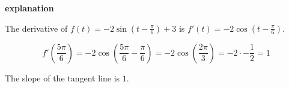 \documentclass{ximera}
\begin{document}
\begin{example}
\textbf{\textcolor{red!75!green}{explanation}} 



The derivative of $f(t) = -2 \sin\left( t - \frac{\pi}{6} \right) + 3$ is $f'(t) = -2 \cos\left( t - \frac{\pi}{6} \right)$.



\[ f'\left( \frac{5 \pi}{6} \right) = -2 \cos\left( \frac{5 \pi}{6} - \frac{\pi}{6} \right) = -2 \cos\left( \frac{2 \pi}{3} \right)  = -2 \cdot -\frac{1}{2} = 1\]


The slope of the tangent line is $1$.



\end{example}
\end{document}
